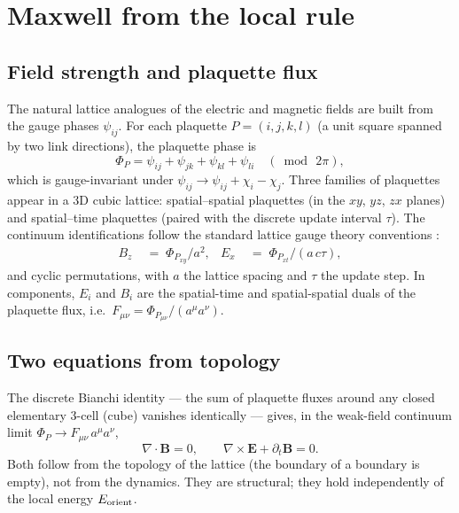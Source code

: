 \documentclass[11pt,a4paper]{article}
\begin{document}
\section{Maxwell from the local rule}
\label{sec:maxwell}

\subsection{Field strength and plaquette flux}

The natural lattice analogues of the electric and magnetic
fields are built from the gauge phases $\psi_{ij}$. For each
plaquette $P = (i,j,k,l)$ (a unit square spanned by two link
directions), the plaquette phase is
\begin{equation}
\Phi_P = \psi_{ij} + \psi_{jk} + \psi_{kl} + \psi_{li}
\quad (\bmod\,2\pi),
\label{eq:plaquette-flux}
\end{equation}
which is gauge-invariant under
$\psi_{ij} \to \psi_{ij} + \chi_i - \chi_j$. Three families of
plaquettes appear in a 3D cubic lattice: spatial--spatial
plaquettes (in the $xy$, $yz$, $zx$ planes) and spatial--time
plaquettes (paired with the discrete update interval $\tau$).
The continuum identifications follow the standard lattice
gauge theory conventions \cite{kogut1979}:
\begin{align}
B_z &\;=\; \Phi_{P_{xy}} / a^2,
& E_x &\;=\; \Phi_{P_{xt}} / (a\,c\tau),
\end{align}
and cyclic permutations, with $a$ the lattice spacing and
$\tau$ the update step. In components, $E_i$ and $B_i$ are the
spatial-time and spatial-spatial duals of the plaquette flux,
i.e.\ $F_{\mu\nu} = \Phi_{P_{\mu\nu}} / (a^\mu a^\nu)$.

\subsection{Two equations from topology}

The discrete Bianchi identity --- the sum of plaquette fluxes
around any closed elementary 3-cell (cube) vanishes
identically --- gives, in the weak-field continuum limit
$\Phi_P \to F_{\mu\nu}\, a^\mu a^\nu$,
\begin{equation}
\nabla \cdot \mathbf{B} = 0,
\qquad
\nabla \times \mathbf{E} + \partial_t \mathbf{B} = 0.
\end{equation}
Both follow from the topology of the lattice (the boundary of
a boundary is empty), not from the dynamics. They are
structural; they hold independently of the local energy
$E_{\rm orient}$.
\end{document}

